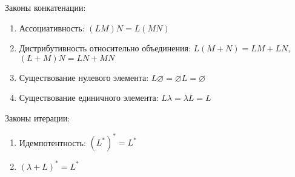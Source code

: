 Законы конкатенации:
\begin{enumerate}
	\item Ассоциативность: $(LM)N = L(MN)$
	\item Дистрибутивность относительно объединения: $L(M + N) = LM + LN$, $(L + M)N = LN + MN$
	\item Существование нулевого элемента: $L \varnothing = \varnothing L = \varnothing$
	\item Существование единичного элемента: $L \lambda = \lambda L = L$
\end{enumerate}

Законы итерации:
\begin{enumerate}
	\item Идемпотентность: $(L^*)^* = L^*$
	\item $(\lambda + L)^* = L^*$
\end{enumerate}
